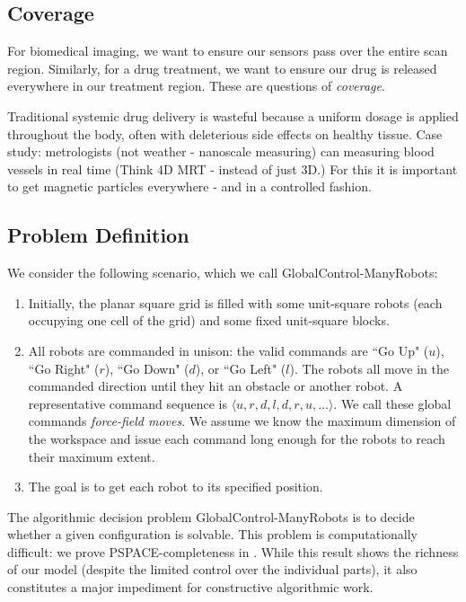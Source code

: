 \documentclass[letterpaper, 10 pt, conference]{ieeeconf}
\begin{document}
  
  
  \subsection{Coverage}\label{sec:Coverage}

 
  
  For biomedical imaging, we want to ensure our sensors pass over the entire scan region.  Similarly, for a drug treatment, we want to ensure our drug is released everywhere in our treatment region.  These are questions of \emph{coverage}.
  
  Traditional systemic drug delivery is wasteful because a uniform dosage is applied throughout the body, often with deleterious side effects on healthy tissue.
   Case study:  metrologists (not weather - nanoscale measuring) can measuring blood vessels in real time (Think 4D MRT - instead of just 3D.) For this it is important to get magnetic particles everywhere - and in a controlled fashion. 
  
    
  \subsection{Problem Definition}\label{subsec:GeneralProblemDefinition}
We consider the following scenario, which we call {\sc GlobalControl-ManyRobots}:
    \begin{enumerate}
\item Initially, the planar square grid is filled with some unit-square robots (each occupying one cell of the grid)  and some fixed unit-square blocks.
\item All robots are commanded in unison: the valid commands are  ``Go Up" ($u$), ``Go Right" ($r$), ``Go Down" ($d$), or ``Go Left" ($l$).  The robots all move in the commanded direction until they hit an obstacle or another robot.  A representative command sequence is $\langle u,r,d,l,d,r,u,\ldots\rangle$. We call these global commands \emph{force-field moves}. We assume we know the maximum dimension of the workspace and issue each command long enough for the robots to reach their maximum extent.
\item The goal is to get
each robot to its specified position.
\end{enumerate}
   The algorithmic decision problem {\sc GlobalControl-ManyRobots}  is to decide whether a given configuration is solvable.
This problem is computationally difficult: we prove PSPACE-completeness in \cite{Becker2014}. While this result shows
the richness of our model (despite the limited control over the individual parts), it also constitutes
a major impediment for constructive algorithmic work.
\end{document}

